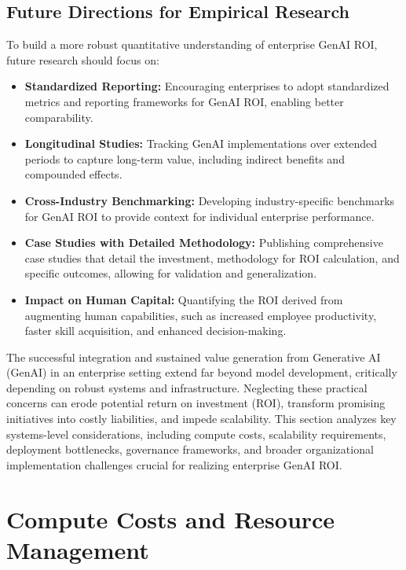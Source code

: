 \documentclass[10pt,twocolumn,letterpaper]{article}
\begin{document}
\subsection{Future Directions for Empirical Research}


To build a more robust quantitative understanding of enterprise GenAI ROI, future research should focus on:
\begin{itemize}
  \item \textbf{Standardized Reporting:} Encouraging enterprises to adopt standardized metrics and reporting frameworks for GenAI ROI, enabling better comparability.
  \item \textbf{Longitudinal Studies:} Tracking GenAI implementations over extended periods to capture long-term value, including indirect benefits and compounded effects.
  \item \textbf{Cross-Industry Benchmarking:} Developing industry-specific benchmarks for GenAI ROI to provide context for individual enterprise performance.
  \item \textbf{Case Studies with Detailed Methodology:} Publishing comprehensive case studies that detail the investment, methodology for ROI calculation, and specific outcomes, allowing for validation and generalization.
  \item \textbf{Impact on Human Capital:} Quantifying the ROI derived from augmenting human capabilities, such as increased employee productivity, faster skill acquisition, and enhanced decision-making.
\end{itemize}

\cite{openalex_w4400993506}





The successful integration and sustained value generation from Generative AI (GenAI) in an enterprise setting extend far beyond model development, critically depending on robust systems and infrastructure. Neglecting these practical concerns can erode potential return on investment (ROI), transform promising initiatives into costly liabilities, and impede scalability. This section analyzes key systems-level considerations, including compute costs, scalability requirements, deployment bottlenecks, governance frameworks, and broader organizational implementation challenges crucial for realizing enterprise GenAI ROI.


\section{Compute Costs and Resource Management}
\end{document}
